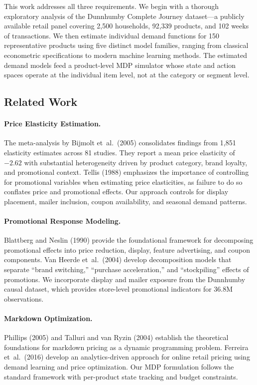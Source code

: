 \documentclass[12pt,a4paper]{article}
\begin{document}
This work addresses all three requirements. We begin with a thorough
exploratory analysis of the Dunnhumby Complete Journey dataset---a
publicly available retail panel covering 2,500 households, 92,339
products, and 102 weeks of transactions. We then estimate individual
demand functions for 150 representative products using five distinct
model families, ranging from classical econometric specifications to
modern machine learning methods. The estimated demand models feed a
product-level MDP simulator whose state and action spaces operate at
the individual item level, not at the category or segment level.

\subsection{Related Work}

\paragraph{Price Elasticity Estimation.}
The meta-analysis by Bijmolt et~al.\ (2005) consolidates findings
from 1,851 elasticity estimates across 81 studies. They report a mean
price elasticity of $-2.62$ with substantial heterogeneity driven by
product category, brand loyalty, and promotional context. Tellis
(1988) emphasizes the importance of controlling for promotional
variables when estimating price elasticities, as failure to do so
conflates price and promotional effects. Our approach controls for
display placement, mailer inclusion, coupon availability, and
seasonal demand patterns.

\paragraph{Promotional Response Modeling.}
Blattberg and Neslin (1990) provide the foundational framework for
decomposing promotional effects into price reduction, display,
feature advertising, and coupon components. Van Heerde et~al.\ (2004)
develop decomposition models that separate ``brand switching,''
``purchase acceleration,'' and ``stockpiling'' effects of promotions.
We incorporate display and mailer exposure from the Dunnhumby causal
dataset, which provides store-level promotional indicators for 36.8M
observations.

\paragraph{Markdown Optimization.}
Phillips (2005) and Talluri and van Ryzin (2004) establish the
theoretical foundations for markdown pricing as a dynamic programming
problem. Ferreira et~al.\ (2016) develop an analytics-driven approach
for online retail pricing using demand learning and price optimization.
Our MDP formulation follows the standard framework with per-product
state tracking and budget constraints.
\end{document}
